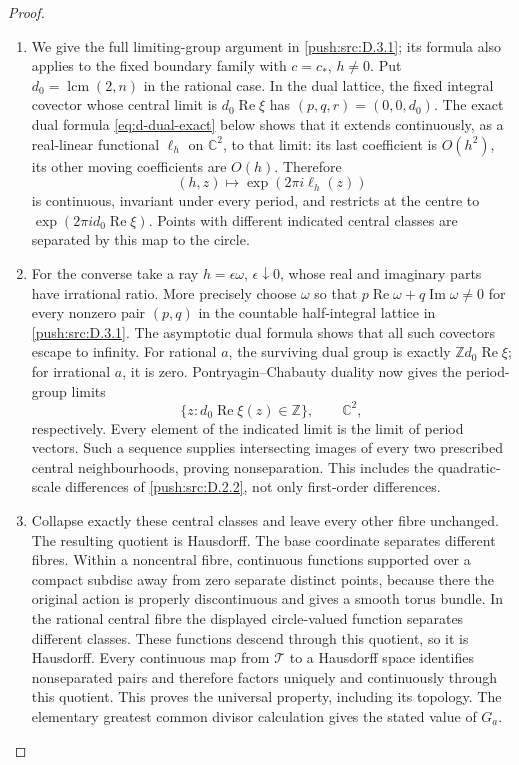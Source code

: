 \begin{proof}
\begin{enumerate}[label=\arabic*.,leftmargin=*]
\item We give the full limiting-group argument in \ref{push:src:D.3.1}; its formula also
applies to the fixed boundary family with \(c=c_*\), \(h\ne0\).
Put \(d_0=\operatorname{lcm}(2,n)\) in the rational case. In the dual
lattice, the fixed integral covector whose central limit is
\(d_0\operatorname{Re}\xi\) has
\((p,q,r)=(0,0,d_0)\). The exact dual formula
\eqref{eq:d-dual-exact} below shows that it extends continuously, as a
real-linear functional \(\ell_h\) on \(\mathbb C^2\), to that limit:
its last coefficient is \(O(h^2)\), its other moving coefficients
are \(O(h)\). Therefore
\[
 (h,z)\longmapsto\exp(2\pi i\ell_h(z))
\]
is continuous, invariant under every period, and restricts at the
centre to \(\exp(2\pi i d_0\operatorname{Re}\xi)\).
Points with different indicated central classes are separated by this
map to the circle.

\item For the converse take a ray \(h=\epsilon\omega\),
\(\epsilon\downarrow0\), whose real and imaginary parts have
irrational ratio. More precisely choose \(\omega\) so that
\(p\operatorname{Re}\omega+q\operatorname{Im}\omega\ne0\)
for every nonzero pair \((p,q)\) in the countable half-integral
lattice in \ref{push:src:D.3.1}. The asymptotic dual formula shows that all such
covectors escape to infinity. For rational \(a\), the surviving dual
group is exactly \(\mathbb Z d_0\operatorname{Re}\xi\); for
irrational \(a\), it is zero. Pontryagin--Chabauty duality
\cite[Theorem~3.1, p.~2017; proof, p.~2018]{Cornulier2011} now gives the period-group limits
\[
 \{z:d_0\operatorname{Re}\xi(z)\in\mathbb Z\},\qquad
 \mathbb C^2,
\]
respectively. Every element of the indicated limit is the limit of
period vectors. Such a sequence supplies intersecting images
of every two prescribed central neighbourhoods, proving
nonseparation. This includes the quadratic-scale differences of
\ref{push:src:D.2.2}, not only first-order differences.

\item Collapse exactly these central classes and leave every other fibre
unchanged. The resulting quotient is Hausdorff. The base coordinate
separates different fibres. Within a noncentral fibre, continuous
functions supported over a compact subdisc away from zero separate
distinct points, because there the original action is properly
discontinuous and gives a smooth torus bundle. In the rational central
fibre the displayed circle-valued function separates different
classes. These functions descend through this quotient, so
it is Hausdorff. Every continuous map from \(\mathcal T\) to a
Hausdorff space identifies nonseparated pairs and therefore factors
uniquely and continuously through this quotient. This proves the
universal property, including its topology. The elementary greatest
common divisor calculation gives the stated value of \(G_a\).
\end{enumerate}
\end{proof}